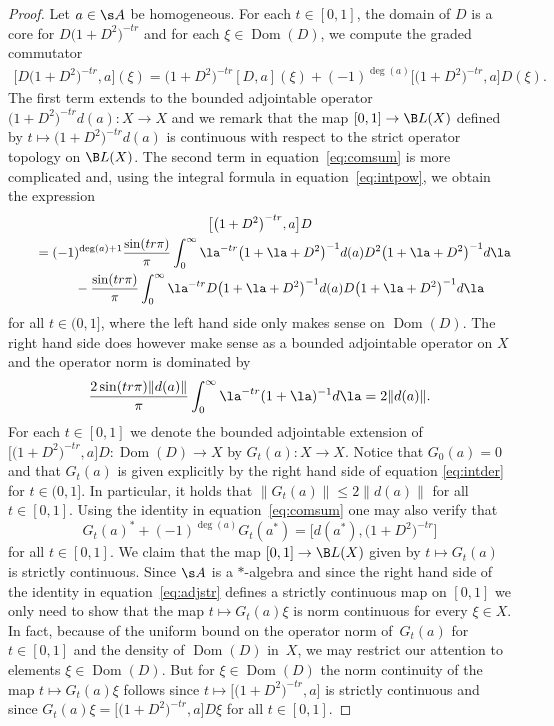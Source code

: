 \begin{proof}
Let $a \in \s A$ be homogeneous. For each $t \in [0,1]$, the domain of $D$ is a core for $D\big(1 + D^2\big)^{-tr}$ and for each $\xi \in \operatorname{Dom}(D)$, we compute the graded commutator
\begin{gather}\label{eq:comsum}
\big[ D \big(1 + D^2\big)^{- tr} , a \big](\xi) = \big(1 + D^2\big)^{-tr} [D,a] (\xi) + (-1)^{\deg (a)}\big[ \big(1 + D^2\big)^{-tr},a\big] D(\xi) .
\end{gather}
The first term extends to the bounded adjointable operator $\big(1 + D^2\big)^{-tr} d(a)\colon X \to X$ and we remark that the map $[0,1] \to \B L(X)$ defined by $t \mapsto \big(1 + D^2\big)^{-tr} d(a)$ is continuous with respect to the strict operator topology on $\B L(X)$. The second term in equation~\eqref{eq:comsum} is more complicated and, using the integral formula in equation~\eqref{eq:intpow}, we obtain the expression
\begin{gather}
\big[ \big(1 + D^2\big)^{-tr},a\big] D \nonumber\\
\qquad{} = (-1)^{\deg (a) + 1} \frac{\sin(tr \pi)}{\pi} \int_0^\infty \la^{-tr} \big(1 + \la + D^2\big)^{-1} d(a) D^2 \big(1 + \la + D^2\big)^{-1} d\la \nonumber\\
\qquad\quad{} - \frac{\sin(tr \pi)}{\pi} \int_0^\infty \la^{-tr} D \big(1 + \la + D^2\big)^{-1} d(a) D \big(1 + \la + D^2\big)^{-1} d\la\label{eq:intder}
\end{gather}
for all $t \in (0,1]$, where the left hand side only makes sense on $\operatorname{Dom}(D)$. The right hand side does however make sense as a bounded adjointable operator on $X$ and the operator norm is dominated by
\[
\frac{2 \sin(tr \pi) \| d(a) \| }{\pi} \int_0^\infty \la^{-tr} (1 + \la)^{-1} d\la = 2 \| d(a) \| .
\]
For each $t \in [0,1]$ we denote the bounded adjointable extension of $\big[\big(1 + D^2\big)^{-tr},a\big] D\colon \operatorname{Dom}(D) \allowbreak \to X$ by $G_t(a)\colon X \to X$. Notice that $G_0(a) = 0$ and that $G_t(a)$ is given explicitly by the right hand side of equation \eqref{eq:intder} for $t \in (0,1]$. In particular, it holds that $\| G_t(a) \| \leq 2 \| d(a) \|$ for all $t \in [0,1]$. Using the identity in equation~\eqref{eq:comsum} one may also verify that
\begin{equation}\label{eq:adjstr}
G_t(a)^* + (-1)^{\deg (a)}G_t(a^*) = \big[ d(a^*), \big(1 + D^2\big)^{-tr} \big]
\end{equation}
for all $t \in [0,1]$. We claim that the map $[0,1] \to \B L(X)$ given by $t \mapsto G_t(a)$ is strictly continuous. Since $\s A$ is a $*$-algebra and since the right hand side of the identity in equation~\eqref{eq:adjstr} defines a strictly continuous map on $[0,1]$ we only need to show that the map $t \mapsto G_t(a) \xi$ is norm continuous for every $\xi \in X$. In fact, because of the uniform bound on the operator norm of~$G_t(a)$ for $t \in [0,1]$ and the density of $\operatorname{Dom}(D)$ in~$X$, we may restrict our attention to elements $\xi \in \operatorname{Dom}(D)$. But for $\xi \in \operatorname{Dom}(D)$ the norm continuity of the map $t \mapsto G_t(a) \xi$ follows since $t \mapsto \big[ \big(1 + D^2\big)^{-tr}, a\big]$ is strictly continuous and since $G_t(a) \xi = \big[ \big(1 + D^2\big)^{-tr},a\big] D \xi$ for all $t \in [0,1]$.


\end{proof}
